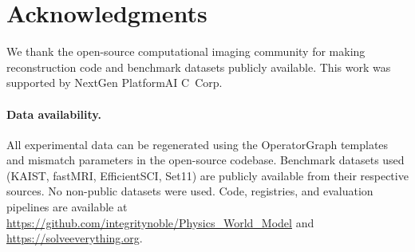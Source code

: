 











\section*{Acknowledgments}
We thank the open-source computational imaging community for making reconstruction code and benchmark datasets publicly available. This work was supported by NextGen PlatformAI C~Corp.

\paragraph{Data availability.}
All experimental data can be regenerated using the OperatorGraph templates and mismatch parameters in the open-source codebase. Benchmark datasets used (KAIST, fastMRI, EfficientSCI, Set11) are publicly available from their respective sources. No non-public datasets were used. Code, registries, and evaluation pipelines are available at \url{https://github.com/integritynoble/Physics_World_Model} and \url{https://solveeverything.org}.





